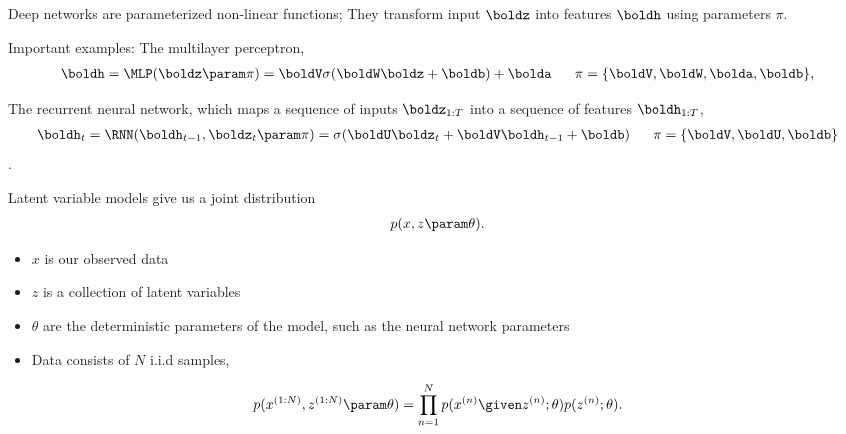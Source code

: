 \begin{frame}
Deep networks are parameterized non-linear functions; They transform input $\boldz$ into features $\boldh$ 
using parameters $\pi$. 


\vspace{0.5cm}
Important examples: The multilayer perceptron,
\begin{align*}
\boldh = \MLP(\boldz \param \pi) = \boldV \sigma (\boldW  \boldz + \boldb) + \bolda \ \ \ \ \  \pi = \{ \boldV, \boldW,  \bolda, \boldb\},
\end{align*}

\pause 
The recurrent neural network, which maps a sequence of inputs $\boldz_{1:T}$ into a sequence of features $\boldh_{1:T}$,
\begin{align*}
\boldh_{t} =  \RNN(\boldh_{t-1}, \boldz_t \param \pi) = \sigma (\boldU  \boldz_t + \boldV \boldh_{t-1} + \boldb) \ \ \ \ \  \pi = \{ \boldV, \boldU, \boldb\}
\end{align*}.

\end{frame}


\begin{frame}

Latent variable models give us a joint distribution
\begin{align*}
p(x, z \param \theta).
\end{align*}

\pause
\begin{itemize}
    \item $x$ is our observed data
    \item $z$ is a collection of latent variables
    \item $\theta$ are the deterministic parameters of the model, such as the neural network parameters
\end{itemize}

\pause

\begin{itemize}
    \item Data consists of $N$ i.i.d samples,
\end{itemize}


                \[ p(x^{(1:N)}, z^{(1:N)} \param \theta ) = \prod_{n=1}^N p(x^{(n)} \given z^{(n)}; \theta) p(z^{(n)};\theta). \]

\end{frame}

